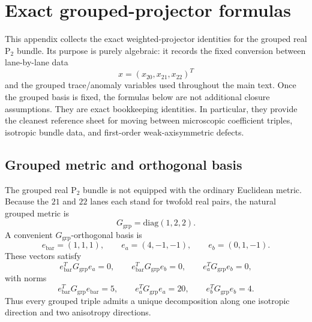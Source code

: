 \documentclass[11pt]{article}
\theoremstyle{definition}
\newcommand{\Ptwo}{\ensuremath{\mathrm{P}_2}}
\newcommand{\diag}{\mathrm{diag}}
\begin{document}
\section{Exact grouped-projector formulas}
\label{app:grouped-projectors}

This appendix collects the exact weighted-projector identities for the grouped real $\Ptwo$ bundle. Its purpose is purely algebraic: it records the fixed conversion between lane-by-lane data
\[
 x=(x_{20},x_{21},x_{22})^T
\]
and the grouped trace/anomaly variables used throughout the main text. Once the grouped basis is fixed, the formulas below are not additional closure assumptions. They are exact bookkeeping identities. In particular, they provide the cleanest reference sheet for moving between microscopic coefficient triples, isotropic bundle data, and first-order weak-axisymmetric defects.

\subsection{Grouped metric and orthogonal basis}

The grouped real $\Ptwo$ bundle is not equipped with the ordinary Euclidean metric. Because the $21$ and $22$ lanes each stand for twofold real pairs, the natural grouped metric is
\begin{equation}
 G_{\mathrm{grp}}=\diag(1,2,2).
 \label{eq:app-grouped-metric}
\end{equation}
A convenient $G_{\mathrm{grp}}$-orthogonal basis is
\begin{equation}
 e_{\mathrm{bar}}=(1,1,1),
 \qquad
 e_a=(4,-1,-1),
 \qquad
 e_b=(0,1,-1).
 \label{eq:app-grouped-basis}
\end{equation}
These vectors satisfy
\begin{equation}
 e_{\mathrm{bar}}^T G_{\mathrm{grp}} e_a=0,
 \qquad
 e_{\mathrm{bar}}^T G_{\mathrm{grp}} e_b=0,
 \qquad
 e_a^T G_{\mathrm{grp}} e_b=0,
 \label{eq:app-grouped-orthogonality}
\end{equation}
with norms
\begin{equation}
 e_{\mathrm{bar}}^T G_{\mathrm{grp}} e_{\mathrm{bar}}=5,
 \qquad
 e_a^T G_{\mathrm{grp}} e_a=20,
 \qquad
 e_b^T G_{\mathrm{grp}} e_b=4.
 \label{eq:app-grouped-norms}
\end{equation}
Thus every grouped triple admits a unique decomposition along one isotropic direction and two anisotropy directions.
\end{document}

